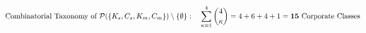 \documentclass[preview]{standalone}
\begin{document}
\begin{align*}
\special{dvisvgm:raw <g id='unique000'>}\text{Combinatorial Taxonomy of }\mathcal{P}(\{K_s,C_s,K_m,C_m\})\setminus\{\emptyset\}:\quad \sum_{\kappa=1}^4 \binom{4}{\kappa} = 4 + 6 + 4 + 1 = \mathbf{15\text{ Corporate Classes}}\special{dvisvgm:raw </g>}
\end{align*}
\end{document}
